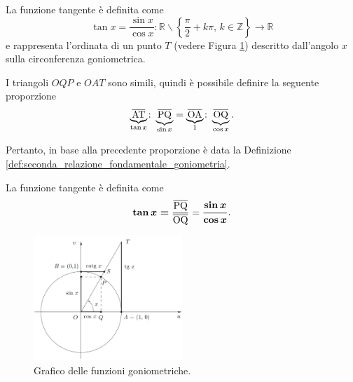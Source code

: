 \begin{definition}[Tangente]
    La funzione tangente è definita come
    \begin{equation*}
        \tan x=\frac{\sin x}{\cos x}\colon \mathbb R\backslash\left\{\frac{\pi}{2}+k\pi,\,k\in\mathbb Z\right\}\rightarrow\mathbb R
    \end{equation*}
    e rappresenta l'ordinata di un punto $T$ (vedere Figura \ref{fig:TrigFunctionDiagram}) descritto dall'angolo $x$ sulla circonferenza goniometrica. 
\end{definition}

I triangoli $OQP$ e $OAT$ sono simili, quindi è possibile definire la seguente proporzione
\begin{equation*}
    \underbrace{\overline{\rm AT}}_{\tan x}\colon\underbrace{\overline{\rm PQ}}_{\sin x}=\underbrace{\overline{\rm OA}}_{1}\colon\underbrace{\overline{\rm OQ}}_{\cos x}.
\end{equation*}

Pertanto, in base alla precedente proporzione è data la Definizione \ref{def:seconda_relazione_fondamentale_goniometria}.

\begin{definition}\label{def:seconda_relazione_fondamentale_goniometria}
La funzione tangente è definita come
    \begin{equation}\label{eq:seconda_relazione_fondamentale_goniometria}
        \boldsymbol{\tan x=}\frac{\overline{\rm PQ}}{\overline{\rm OQ}}=\boldsymbol{\frac{\sin x}{\cos x}}.
    \end{equation}
\end{definition}

\begin{figure}
    \centering
    \includegraphics[width=0.5\textwidth]{Analisi1/figures/TrigFunctionDiagram.jpeg}
    \caption{Grafico delle funzioni goniometriche.}
    \label{fig:TrigFunctionDiagram}
\end{figure}

